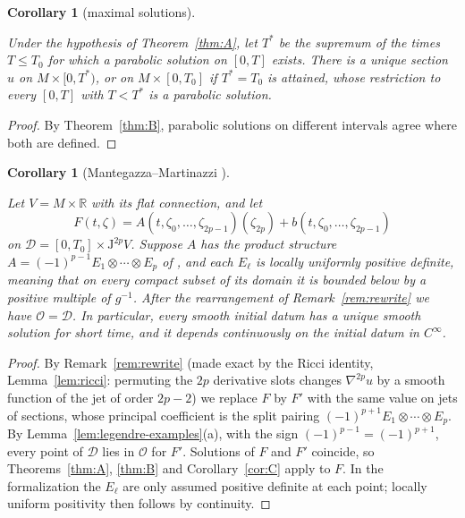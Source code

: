 \documentclass[11pt,reqno]{amsart}
\newtheorem{corollary}[theorem]{Corollary}
\theoremstyle{definition}
\theoremstyle{remark}
\newcommand{\R}{\mathbb{R}}
\newcommand{\Dom}{\mathcal{D}}
\newcommand{\Par}{\mathcal{O}}
\newcommand{\Jet}{\mathrm{J}}
\newcommand{\lean}[1]{}
\newcommand{\uses}[1]{}
\numberwithin{equation}{section}
\begin{document}
\begin{corollary}[maximal solutions]\label{cor:maximal}
\lean{ShortTime.exists_maximal_solution, ShortTime.EquationData.isParabolicSolution_of_le}
\uses{def:solution}
Under the hypothesis of Theorem~\ref{thm:A}, let $T^*$ be the supremum of the times $T\le T_0$ for
which a parabolic solution on $[0,T]$ exists. There is a unique section $u$ on $M\times[0,T^*)$, or on
$M\times[0,T_0]$ if $T^*=T_0$ is attained, whose restriction to every $[0,T]$ with $T<T^*$ is a
parabolic solution.
\end{corollary}

\begin{proof}
\uses{thm:A, thm:B}
By Theorem~\ref{thm:B}, parabolic solutions on different intervals agree where both are defined.
\end{proof}

\begin{corollary}[Mantegazza--Martinazzi {\cite[Thm.~1.1]{MM}}]\label{cor:MM}
\lean{ShortTime.mantegazza_martinazzi, ShortTime.MMData, ShortTime.MMData.F, ShortTime.MMData.toEquationData, ShortTime.MMData.rearranged, ShortTime.MMData.rearranged_isSolution_iff, ShortTime.MMData.rearranged_isParabolicAt, ShortTime.MMData.isParabolicSolution_rearranged, ShortTime.exists_ricci_jetMap, ShortTime.mmPairing_eq_productCLM_add}
\uses{def:solution}
Let $V=M\times\R$ with its flat connection, and let
\[
  F(t,\zeta)=A(t,\zeta_0,\dots,\zeta_{2p-1})(\zeta_{2p})+b(t,\zeta_0,\dots,\zeta_{2p-1})
\]
on $\Dom=[0,T_0]\times\Jet^{2p}V$. Suppose $A$ has the product structure
$A=(-1)^{p-1}E_1\otimes\cdots\otimes E_p$ of \cite{MM}, and each $E_\ell$ is locally uniformly
positive definite, meaning that on every compact subset of its domain it is bounded below by a
positive multiple of $g^{-1}$. After the rearrangement of Remark~\ref{rem:rewrite} we have
$\Par=\Dom$. In particular, every smooth initial datum has a unique smooth solution for short time,
and it depends continuously on the initial datum in $C^\infty$.
\end{corollary}

\begin{proof}
\uses{thm:A, thm:B, cor:C, lem:legendre-examples, lem:ricci}
By Remark~\ref{rem:rewrite} (made exact by the Ricci identity, Lemma~\ref{lem:ricci}: permuting the
$2p$ derivative slots changes $\nabla^{2p}u$ by a smooth function of the jet of order $2p-2$) we
replace $F$ by $F'$ with the same value on jets of sections, whose principal coefficient is the split
pairing $(-1)^{p+1}E_1\otimes\cdots\otimes E_p$. By Lemma~\ref{lem:legendre-examples}(a), with the
sign $(-1)^{p-1}=(-1)^{p+1}$, every point of $\Dom$ lies in $\Par$ for $F'$. Solutions of $F$ and
$F'$ coincide, so Theorems~\ref{thm:A}, \ref{thm:B} and Corollary~\ref{cor:C} apply to $F$. In the
formalization the $E_\ell$ are only assumed positive definite at each point; locally uniform
positivity then follows by continuity.
\end{proof}
\end{document}
